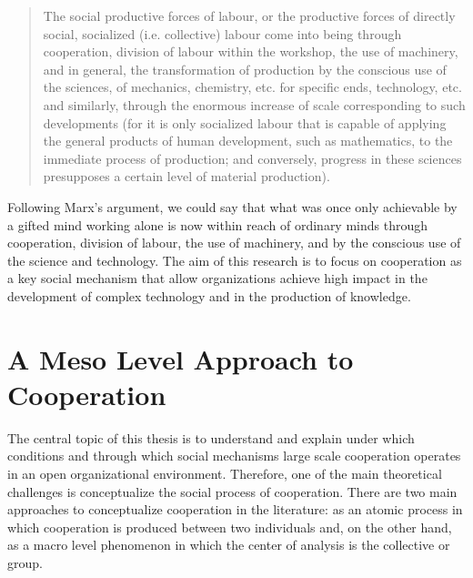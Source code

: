 \begin{quote}
The social productive forces of labour, or the productive forces of directly social, socialized (i.e. collective) labour come into being through cooperation, division of labour within the workshop, the use of machinery, and in general, the transformation of production by the conscious use of the sciences, of mechanics, chemistry, etc. for specific ends, technology, etc. and similarly, through the enormous increase of scale corresponding to such developments (for it is only socialized labour that is capable of applying the general products of human development, such as mathematics, to the immediate process of production; and conversely, progress in these sciences presupposes a certain level of material production). \citep[1024]{marx:1990}
\end{quote}

Following Marx's argument, we could say that what was once only achievable by a gifted mind working alone is now within reach of ordinary minds through cooperation, division of labour, the use of machinery, and by the conscious use of the science and technology. The aim of this research is to focus on cooperation as a key social mechanism that allow organizations achieve high impact in the development of complex technology and in the production of knowledge.

\section{A Meso Level Approach to Cooperation}

The central topic of this thesis is to understand and explain under which conditions and through which social mechanisms large scale cooperation operates in an open organizational environment. Therefore, one of the main theoretical challenges is conceptualize the social process of cooperation. There are two main approaches to conceptualize cooperation in the literature: as an atomic process in which cooperation is produced between two individuals and, on the other hand, as a macro level phenomenon in which the center of analysis is the collective or group.

